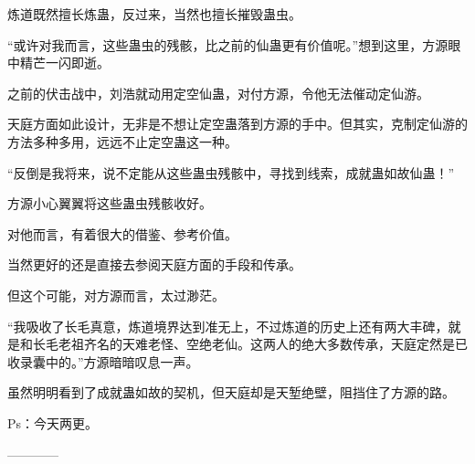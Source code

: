 \begin{this_body}
炼道既然擅长炼蛊，反过来，当然也擅长摧毁蛊虫。

“或许对我而言，这些蛊虫的残骸，比之前的仙蛊更有价值呢。”想到这里，方源眼中精芒一闪即逝。

之前的伏击战中，刘浩就动用定空仙蛊，对付方源，令他无法催动定仙游。

天庭方面如此设计，无非是不想让定空蛊落到方源的手中。但其实，克制定仙游的方法多种多用，远远不止定空蛊这一种。

“反倒是我将来，说不定能从这些蛊虫残骸中，寻找到线索，成就蛊如故仙蛊！”

方源小心翼翼将这些蛊虫残骸收好。

对他而言，有着很大的借鉴、参考价值。

当然更好的还是直接去参阅天庭方面的手段和传承。

但这个可能，对方源而言，太过渺茫。

“我吸收了长毛真意，炼道境界达到准无上，不过炼道的历史上还有两大丰碑，就是和长毛老祖齐名的天难老怪、空绝老仙。这两人的绝大多数传承，天庭定然是已收录囊中的。”方源暗暗叹息一声。

虽然明明看到了成就蛊如故的契机，但天庭却是天堑绝壁，阻挡住了方源的路。

Ps：今天两更。

------------

\end{this_body}

